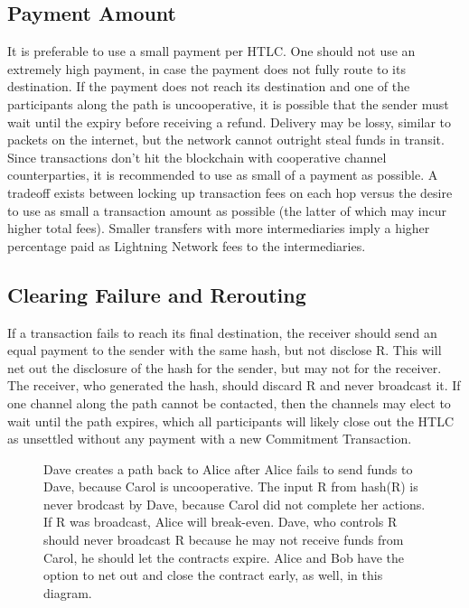 \documentclass[letterpaper,11pt]{article}
\begin{document}
\subsection{Payment Amount}

It is preferable to use a small payment per HTLC. One should not use an
extremely high payment, in case the payment does not fully route to its
destination. If the payment does not reach its destination and one of the
participants along the path is uncooperative, it is possible that the sender
must wait until the expiry before receiving a refund. Delivery may be lossy,
similar to packets on the internet, but the network cannot outright steal funds
in transit. Since transactions don't hit the blockchain with cooperative channel
counterparties, it is recommended to use as small of a payment as possible. A
tradeoff exists between locking up transaction fees on each hop versus the
desire to use as small a transaction amount as possible (the latter of which may
incur higher total fees). Smaller transfers with more intermediaries imply a
higher percentage paid as Lightning Network fees to the intermediaries.

\subsection{Clearing Failure and Rerouting}

If a transaction fails to reach its final destination, the receiver should send
an equal payment to the sender with the same hash, but not disclose R. This
will net out the disclosure of the hash for the sender, but may not for the
receiver. The receiver, who generated the hash, should discard R and never
broadcast it. If one channel along the path cannot be contacted, then the
channels may elect to wait until the path expires, which all participants will
likely close out the HTLC as unsettled without any payment with a new
Commitment Transaction.

\begin{figure}[H]
	\caption{Dave creates a path back to Alice after Alice fails to send
		funds to Dave, because Carol is uncooperative. The input R from
		hash(R) is never brodcast by Dave, because Carol did not
		complete her actions. If R was broadcast, Alice will
		break-even. Dave, who controls R should never broadcast R
		because he may not receive funds from Carol, he should let the
		contracts expire. Alice and Bob have the option to net out and
		close the contract early, as well, in this diagram.
	}
\end{figure}
\end{document}
